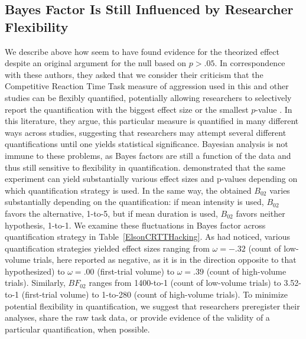 \documentclass[man]{apa6}
\begin{document}
\subsection{Bayes Factor Is Still Influenced by Researcher Flexibility} 
We describe above how \citet{Elson:etal:2013} seem to have found evidence for the theorized effect despite an original argument for the null based on $p > .05$. In correspondence with these authors, they asked that we consider their criticism that the Competitive Reaction Time Task measure of aggression %
used in this and other studies can be flexibly quantified, potentially allowing researchers to selectively report the quantification with the biggest effect size or the smallest $p$-value \citep{Elson:etal:2014}. In this literature, they argue, this particular measure is quantified in many different ways across studies, suggesting that researchers may attempt several different quantifications until one yields statistical significance. Bayesian analysis is not immune to these problems, as Bayes factors are still a function of the data and thus still sensitive to flexibility in quantification. \citet{Elson:etal:2014} demonstrated that the same experiment can yield substantially various effect sizes and p-values depending on which quantification strategy is used. In the same way, the obtained $B_{02}$ varies substantially depending on the quantification: if mean intensity is used, $B_{02}$ favors the alternative, 1-to-5, but if mean duration is used, $B_{02}$ favors neither hypothesis, 1-to-1. We examine these fluctuations in Bayes factor across quantification strategy in Table~\ref{ElsonCRTTHacking}.  As \citet{Elson:etal:2014} had noticed, various quantification strategies yielded effect sizes ranging from $\omega = -.32$ (count of low-volume trials, here reported as negative, as it is in the direction opposite to that hypothesized) to $\omega = .00$ (first-trial volume) to $\omega = .39$ (count of high-volume trials). Similarly, $BF_{02}$ ranges from 1400-to-1 (count of low-volume trials) to 3.52-to-1 (first-trial volume) to 1-to-280 (count of high-volume trials). To minimize potential flexibility in quantification, we suggest that researchers preregister their analyses, share the raw task data, or provide evidence of the validity of a particular quantification, when possible. %
\end{document}
